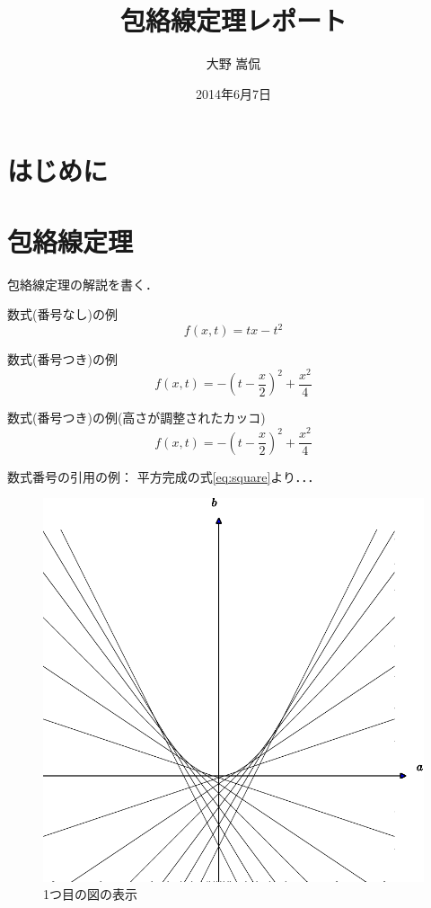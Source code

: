 \documentclass[11pt,a4j,fleqn]{jarticle}
\title{包絡線定理レポート}
\author{大野 嵩侃}
\date{2014年6月7日}
\begin{document}
\maketitle

\section{はじめに}



\section{包絡線定理}

包絡線定理の解説を書く．

数式(番号なし)の例
\[
f(x, t) = t x - t^2
\]


数式(番号つき)の例
\begin{equation}
f(x, t)  = -(t - \frac{x}{2})^2 + \frac{x^2}{4} \label{eq:square}
\end{equation}

数式(番号つき)の例(高さが調整されたカッコ)
\begin{equation}
f(x, t) = -\left(t - \frac{x}{2}\right)^2 + \frac{x^2}{4} \label{eq:square-2}
\end{equation}



数式番号の引用の例：
平方完成の式\eqref{eq:square}より．．．

\begin{figure}
 \centering
 \includegraphics{envelope0.pdf}
 \caption{1つ目の図の表示}
 \label{fig:1}
\end{figure}
\end{document}
